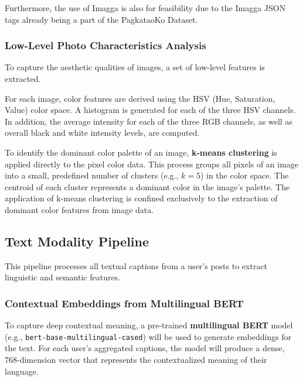Furthermore, the use of Imagga is also for feasibility due to the Imagga JSON tags already being a part of the PagkataoKo Dataset.
\subsubsection{Low-Level Photo Characteristics Analysis}
To capture the aesthetic qualities of images, a set of low-level features is extracted.

For each image, color features are derived using the HSV (Hue, Saturation, Value) color space. A histogram is generated for each of the three HSV channels. In addition, the average intensity for each of the three RGB channels, as well as overall black and white intensity levels, are computed.

To identify the dominant color palette of an image, \textbf{k-means clustering} is applied directly to the pixel color data. This process groups all pixels of an image into a small, predefined number of clusters (e.g., $k=5$) in the color space. The centroid of each cluster represents a dominant color in the image's palette. The application of k-means clustering is confined exclusively to the extraction of dominant color features from image data.

\subsection{Text Modality Pipeline}
This pipeline processes all textual captions from a user's posts to extract linguistic and semantic features.

\subsubsection{Contextual Embeddings from Multilingual BERT}
To capture deep contextual meaning, a pre-trained \textbf{multilingual BERT} model (e.g., \texttt{bert-base-multilingual-cased}) will be used to generate embeddings for the text. For each user's aggregated captions, the model will produce a dense, 768-dimension vector that represents the contextualized meaning of their language.

